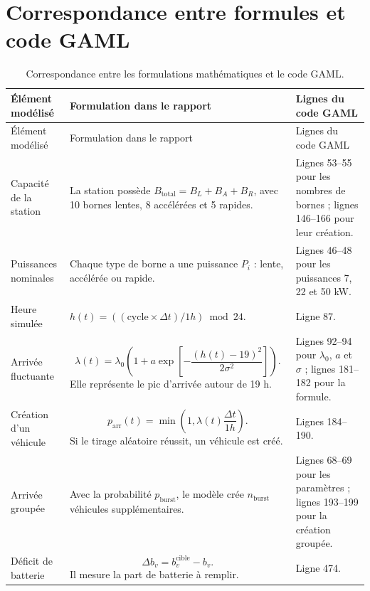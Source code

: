 \documentclass[11pt]{article}
\begin{document}
\section{Correspondance entre formules et code GAML}

\begin{longtable}{L{0.25\textwidth} L{0.38\textwidth} L{0.26\textwidth}}
\caption{Correspondance entre les formulations mathématiques et le code GAML.}\label{tab:formules-code}\\
\toprule
Élément modélisé & Formulation dans le rapport & Lignes du code GAML \\
\midrule
\endfirsthead
\toprule
Élément modélisé & Formulation dans le rapport & Lignes du code GAML \\
\midrule
\endhead
\bottomrule
\endfoot

Capacité de la station &
La station possède $B_{\mathrm{total}}=B_L+B_A+B_R$, avec 10 bornes lentes, 8 accélérées et 5 rapides. &
Lignes 53--55 pour les nombres de bornes ; lignes 146--166 pour leur création. \\

Puissances nominales &
Chaque type de borne a une puissance $P_i$ : lente, accélérée ou rapide. &
Lignes 46--48 pour les puissances 7, 22 et 50 kW. \\

Heure simulée &
$h(t)=((\mathrm{cycle}\times\Delta t)/1h)\bmod 24$. &
Ligne 87. \\

Arrivée fluctuante &
\[
\lambda(t)=\lambda_0\left(1+a\exp\left[-\frac{(h(t)-19)^2}{2\sigma^2}\right]\right).
\]
Elle représente le pic d'arrivée autour de 19 h. &
Lignes 92--94 pour $\lambda_0$, $a$ et $\sigma$ ; lignes 181--182 pour la formule. \\

Création d'un véhicule &
\[
p_{\mathrm{arr}}(t)=\min\left(1,\lambda(t)\frac{\Delta t}{1h}\right).
\]
Si le tirage aléatoire réussit, un véhicule est créé. &
Lignes 184--190. \\

Arrivée groupée &
Avec la probabilité $p_{\mathrm{burst}}$, le modèle crée $n_{\mathrm{burst}}$ véhicules supplémentaires. &
Lignes 68--69 pour les paramètres ; lignes 193--199 pour la création groupée. \\

Déficit de batterie &
\[
\Delta b_v=b_v^{\mathrm{cible}}-b_v.
\]
Il mesure la part de batterie à remplir. &
Ligne 474. \\


\end{longtable}
\end{document}
